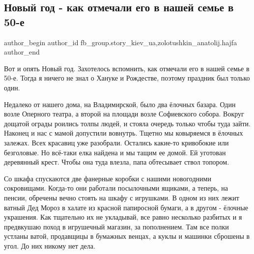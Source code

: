  
 
 
 
 
 
\subsection{Новый год - как отмечали его в нашей семье в 50-е}
\label{sec:30_12_2021.fb.fb_group.story_kiev_ua.4.novyj_god_semja_1950}
 
\ifcmt
 author_begin
   author_id fb_group.story_kiev_ua,zolotushkin_anatolij.hajfa
 author_end
\fi

Вот и опять Новый год. Захотелось вспомнить, как отмечали его в нашей семье в
50-е. Тогда я ничего не знал о Хануке и Рождестве, поэтому праздник был только
один. 


Недалеко от нашего дома, на Владимирской, было два ёлочных базара. Один возле
Оперного театра, а второй на площади возле Софиевского собора. Вокруг дощатой
ограды роились толпы людей, и стояла очередь только чтобы туда зайти. Наконец и
нас с мамой допустили вовнутрь. Тщетно мы ковыряемся в ёлочных залежах. Всех
красавиц уже разобрали. Остались какие-то кривобокие или безголовые. Но
всё-таки елка найдена и мы тащим ее  домой. Ей уготован деревянный крест. Чтобы
она туда влезла, папа обтесывает ствол топором. 

Со шкафа спускаются две фанерные коробки с нашими новогодними сокровищами.
Когда-то они работали посылочными ящиками, а теперь, на пенсии, обречены вечно
стоять на шкафу с игрушками. В одном из них лежит ватный Дед Мороз в халате из
красной папиросной бумаги, а в другом - ёлочные украшения. Как тщательно их не
укладывай, все равно несколько разбитых и я предвкушаю поход в игрушечный
магазин, за пополнением. Там все полки устланы ватой, продавщицы в бумажных
венцах, а куклы и машинки сброшены в угол. До них никому нет дела. 

